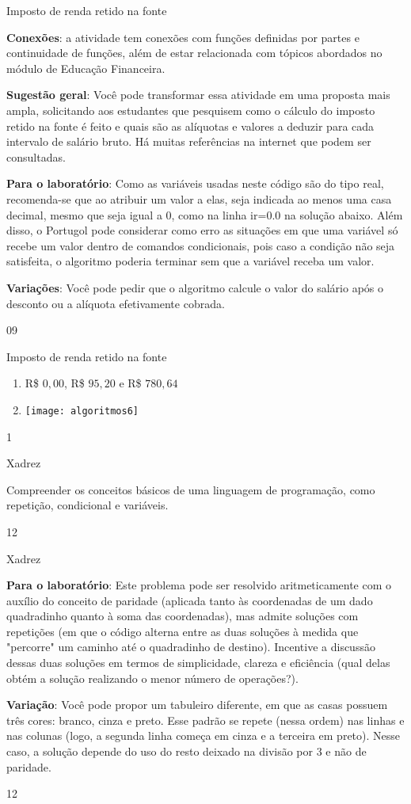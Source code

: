 \begin{sugestions}{Imposto de renda retido na fonte}
{
\textbf{Conexões}: a atividade tem conexões com funções definidas por partes e continuidade de funções, além de estar relacionada com tópicos abordados no módulo de Educação Financeira.

\textbf{Sugestão geral}: Você pode transformar essa atividade em uma proposta mais ampla, solicitando aos estudantes que pesquisem como o cálculo do imposto retido na fonte é feito e quais são as alíquotas e valores a deduzir para cada intervalo de salário bruto. Há muitas referências na internet que podem ser consultadas.

\textbf{Para o laboratório}: Como as variáveis usadas neste código são do tipo real, recomenda-se que ao atribuir um valor a elas, seja indicada ao menos uma casa decimal, mesmo que seja igual a 0, como na linha ir=0.0 na solução abaixo. Além disso, o Portugol pode considerar como erro as situações em que uma variável só recebe um valor dentro de comandos condicionais, pois caso a condição não seja satisfeita, o algoritmo poderia terminar sem que a variável receba um valor.

\textbf{Variações}: Você pode pedir que o algoritmo calcule o valor do salário após o desconto ou a alíquota efetivamente cobrada.
}{0}{9}
\end{sugestions}
\begin{answer}{Imposto de renda retido na fonte}
{
\begin{enumerate}
\item R\$ $0{,}00$, R\$ $95{,}20$ e R\$ $780{,}64$
\item {}
{
\texttt{[image: algoritmos6]}
}
\end{enumerate}
}{1}
\end{answer}
\begin{objectives}{Xadrez}
{
Compreender os conceitos básicos de uma linguagem de programação, como repetição, condicional e variáveis.


}{1}{2}
\end{objectives}
\begin{sugestions}{Xadrez}
{
\textbf{Para o laboratório}: Este problema pode ser resolvido aritmeticamente com o auxílio do conceito de paridade (aplicada tanto às coordenadas de um dado quadradinho quanto à soma das coordenadas), mas admite soluções com repetições (em que o código alterna entre as duas soluções à medida que "percorre"{} um caminho até o quadradinho de destino). Incentive a discussão dessas duas soluções em termos de simplicidade, clareza e eficiência (qual delas obtém a solução realizando o menor número de operações?).

\textbf{Variação}: Você pode propor um tabuleiro diferente, em que as casas possuem três cores: branco, cinza e preto. Esse padrão se repete (nessa ordem) nas linhas e nas colunas (logo, a segunda linha começa em cinza e a terceira em preto). Nesse caso, a solução depende do uso do resto deixado na divisão por 3 e não de paridade.
}{1}{2}
\end{sugestions}
